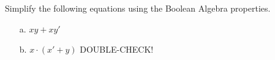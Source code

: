 \documentclass[a4paper,12pt]{book}
\newcounter{question}
\begin{document}
        \begin{questionNOGRADE}{\thequestion}

            Simplify the following equations using the Boolean Algebra properties.

            \begin{enumerate}
                \item[a.]   $xy + xy'$

                \item[b.]   $x \cdot (x' + y)$
                    DOUBLE-CHECK!

            \end{enumerate}
        \end{questionNOGRADE}

        \newpage
\end{document}
